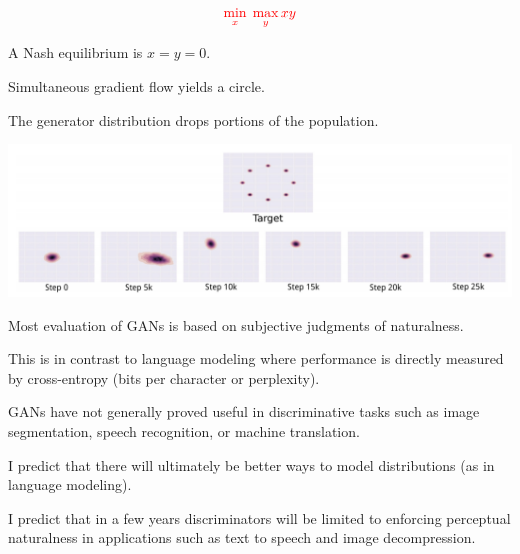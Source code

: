 {

$${\color{red} \min_x \; \max_y xy}$$

\vfill
A Nash equilibrium is $x= y = 0$.

\vfill
Simultaneous gradient flow yields a circle.


The generator distribution drops portions of the population.

\centerline{\includegraphics[width=9in]{../images/Unstable1}}


Most evaluation of GANs is based on subjective judgments of naturalness.

\vfill
This is in contrast to language modeling where performance is directly measured by cross-entropy (bits per character or perplexity).


GANs have not generally proved useful in discriminative tasks such as image segmentation, speech recognition, or machine translation.

\vfill
I predict that there will ultimately be better ways to model distributions (as in language modeling).

\vfill
I predict that in a few years discriminators will be limited to enforcing perceptual naturalness in applications such as
text to speech and image decompression.


}

